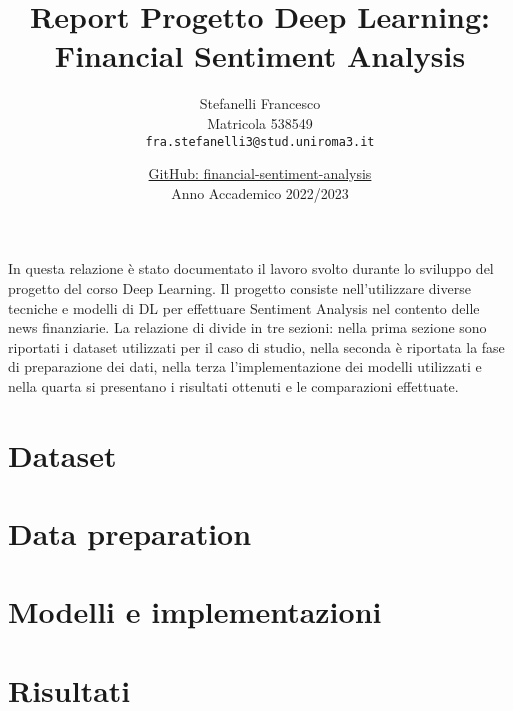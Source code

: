 \documentclass[11pt, english]{article}
\author{
 Stefanelli Francesco \\
 Matricola 538549\\
 \texttt{fra.stefanelli3@stud.uniroma3.it}
}
\title{\huge\textbf{Report Progetto Deep Learning: Financial Sentiment Analysis }}
\date{\href{https://github.com/Francesco9932/financial-sentiment-analysis}{GitHub: financial-sentiment-analysis}\\ Anno Accademico 2022/2023}
\begin{document}
\maketitle
In questa relazione è stato documentato il lavoro svolto durante lo sviluppo del progetto del corso Deep Learning. Il progetto consiste nell'utilizzare diverse tecniche e modelli di DL per effettuare Sentiment Analysis nel contento delle news finanziarie.
La relazione di divide in tre sezioni: nella prima sezione sono riportati i dataset utilizzati per il caso di studio, nella seconda è riportata la fase di preparazione dei dati, nella terza l'implementazione dei modelli utilizzati e nella quarta si presentano i risultati ottenuti e le comparazioni effettuate.

\hypersetup{linkcolor=black}
\tableofcontents

\newpage

\section{Dataset}



\section{\label{section:1}Data preparation}


\section{Modelli e implementazioni}


\section{Risultati}




\end{document}
